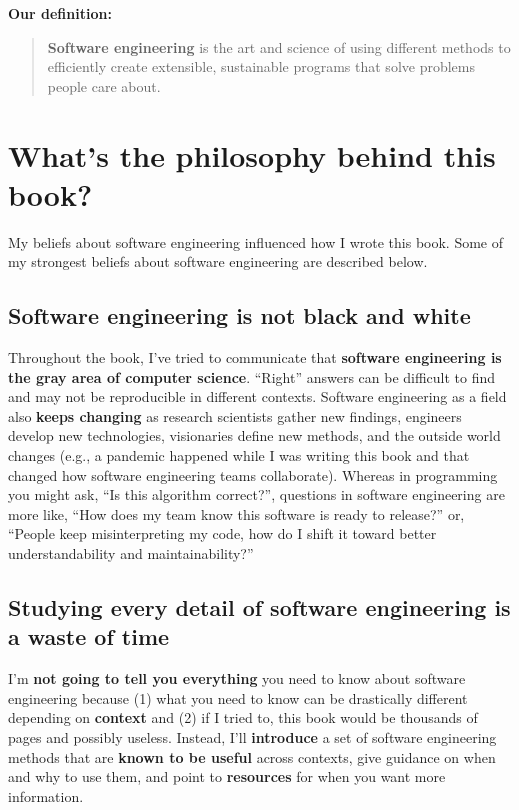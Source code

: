 \spacer
\textbf{Our definition:}

\begin{quote}
\textbf{Software engineering} is the art and science of using different methods to efficiently create extensible, sustainable programs that solve problems people care about.
\end{quote}

\section{What's the philosophy behind this book?}

My beliefs about software engineering influenced how I wrote this book. Some of my strongest beliefs about software engineering are described below.

\subsection{Software engineering is not black and white}
Throughout the book, I've tried to communicate that \textbf{software engineering is the gray area of computer science}. ``Right'' answers can be difficult to find and may not be reproducible in different contexts. Software engineering as a field also \textbf{keeps changing} as research scientists gather new findings, engineers develop new technologies, visionaries define new methods, and the outside world changes (e.g., a pandemic happened while I was writing this book and that changed how software engineering teams collaborate). Whereas in programming you might ask, ``Is this algorithm correct?'', questions in software engineering are more like, ``How does my team know this software is ready to release?'' or, ``People keep misinterpreting my code, how do I shift it toward better understandability and maintainability?''

\subsection{Studying every detail of software engineering is a waste of time}\marginpar{\agileDef\margindivider}\marginpar{\softwareProcessModelDef\margindivider}\marginpar{\iterationDef\margindivider}\marginpar{\incrementDef}
I'm \textbf{not going to tell you everything} you need to know about software engineering because (1) what you need to know can be drastically different depending on \textbf{context} and (2) if I tried to, this book would be thousands of pages and possibly useless. Instead, I'll \textbf{introduce} a set of software engineering methods that are \textbf{known to be useful} across contexts, give guidance on when and why to use them, and point to \textbf{resources} for when you want more information.

